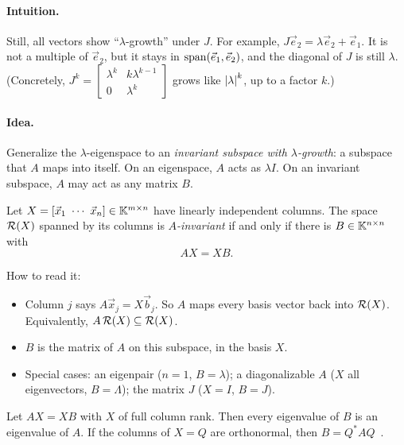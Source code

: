 \paragraph{Intuition.} Still, all vectors show ``$\lambda$-growth'' under $J$. For example, $J\vec{e}_2 = \lambda\vec{e}_2 + \vec{e}_1$. It is not a multiple of $\vec{e}_2$, but it stays in $\operatorname{span}(\vec{e}_1, \vec{e}_2)$, and the diagonal of $J$ is still $\lambda$. (Concretely, $J^k = \left[\begin{smallmatrix} \lambda^k & k\lambda^{k-1} \\ 0 & \lambda^k \end{smallmatrix}\right]$ grows like $\left\lvert \lambda \right\rvert^k$, up to a factor $k$.)

\paragraph{Idea.} Generalize the $\lambda$-eigenspace to an \emph{invariant subspace with $\lambda$-growth}: a subspace that $A$ maps into itself. On an eigenspace, $A$ acts as $\lambda I$. On an invariant subspace, $A$ may act as any matrix $B$.

\begin{definition}
  \label{def:invariant}
  Let $X = [\vec{x}_1\ \cdots\ \vec{x}_n] \in \mathbb{K}^{m \times n}$ have linearly independent columns. The space $\mathcal{R}(X)$ spanned by its columns is \emph{$A$-invariant} if and only if there is $B \in \mathbb{K}^{n \times n}$ with
  \begin{equation}
    AX = XB.
  \end{equation}
\end{definition}

How to read it:
\begin{itemize}
  \item Column $j$ says $A\vec{x}_j = X\vec{b}_j$. So $A$ maps every basis vector back into $\mathcal{R}(X)$. Equivalently, $A\,\mathcal{R}(X) \subseteq \mathcal{R}(X)$.
  \item $B$ is the matrix of $A$ on this subspace, in the basis $X$.
  \item Special cases: an eigenpair ($n = 1$, $B = \lambda$); a diagonalizable $A$ ($X$ all eigenvectors, $B = \Lambda$); the matrix $J$ ($X = I$, $B = J$).
\end{itemize}

\begin{proposition}
  \label{prop:invariant-eig}
  Let $AX = XB$ with $X$ of full column rank. Then every eigenvalue of $B$ is an eigenvalue of $A$. If the columns of $X = Q$ are orthonormal, then $B = Q^\ast AQ$~\cite[Prop.~4.3]{Demmel}.
\end{proposition}

